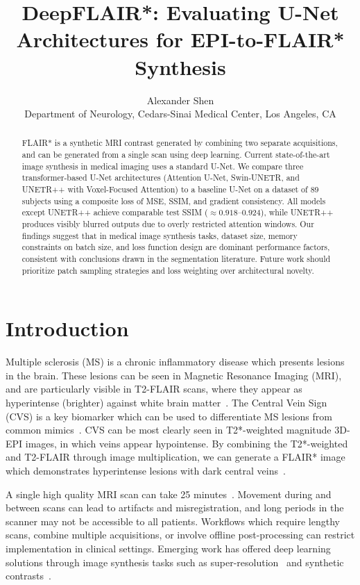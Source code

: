 \documentclass{article}
\title{DeepFLAIR*: Evaluating U-Net Architectures for EPI-to-FLAIR* Synthesis}
\author{%
  Alexander Shen \\
  Department of Neurology, Cedars-Sinai Medical Center, Los Angeles, CA
}
\begin{document}
\maketitle

\begin{abstract}
FLAIR* is a synthetic MRI contrast generated by combining two separate
acquisitions, and can be generated from a single scan using deep learning.
Current state-of-the-art image synthesis in medical imaging uses a standard
U-Net. We compare three transformer-based U-Net architectures (Attention U-Net,
Swin-UNETR, and UNETR++ with Voxel-Focused Attention) to a baseline U-Net on
a dataset of 89 subjects using a composite loss of MSE, SSIM, and gradient
consistency. All models except UNETR++ achieve comparable test SSIM
(${\approx}0.918$--$0.924$), while UNETR++ produces visibly blurred outputs
due to overly restricted attention windows. Our findings suggest that in medical
image synthesis tasks, dataset size, memory constraints on batch size, and loss
function design are dominant performance factors, consistent with conclusions
drawn in the segmentation literature. Future work should prioritize patch
sampling strategies and loss weighting over architectural novelty.
\end{abstract}

\section{Introduction}

Multiple sclerosis (MS) is a chronic inflammatory disease which presents
lesions in the brain. These lesions can be seen in Magnetic Resonance Imaging
(MRI), and are particularly visible in T2-FLAIR scans, where they appear as
hyperintense (brighter) against white brain matter~\cite{thompson2018diagnosis,filippi2011magnetic}. The Central Vein
Sign (CVS) is a key biomarker which can be used to differentiate MS lesions
from common mimics~\cite{sati2016central,daboul2023effect}. CVS can be most clearly seen in T2*-weighted
magnitude 3D-EPI images, in which veins appear hypointense. By combining the
T2*-weighted and T2-FLAIR through image multiplication, we can generate a
FLAIR* image which demonstrates hyperintense lesions with dark central
veins~\cite{sati2012flair,sati2017rapid}.

A single high quality MRI scan can take 25 minutes~\cite{ozutemiz2023seven}. Movement
during and between scans can lead to artifacts and misregistration, and long
periods in the scanner may not be accessible to all patients. Workflows which
require lengthy scans, combine multiple acquisitions, or involve offline
post-processing can restrict implementation in clinical settings. Emerging work
has offered deep learning solutions through image synthesis tasks such as
super-resolution~\cite{quah2023improving} and synthetic contrasts~\cite{genc2023deepswi,baburyan2025deepflair}.
\end{document}
